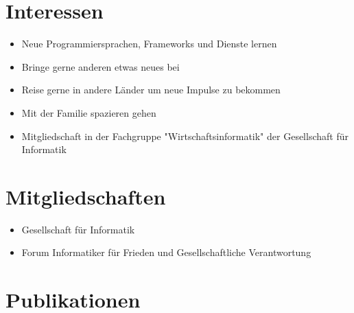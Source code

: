 \documentclass[a4paper]{friggeri-cv} %
\begin{document}
\section{Interessen}
\begin{itemize}
  \item Neue Programmiersprachen, Frameworks und Dienste lernen
  \item Bringe gerne anderen etwas neues bei
  \item Reise gerne in andere Länder um neue Impulse zu bekommen
  \item Mit der Familie spazieren gehen
  \item Mitgliedschaft in der Fachgruppe "Wirtschaftsinformatik" der Gesellschaft für Informatik
\end{itemize}

\section{Mitgliedschaften}
\begin{itemize}
	\item Gesellschaft für Informatik
	\item Forum Informatiker für Frieden und Gesellschaftliche Verantwortung
\end{itemize}

\newpage
\section{Publikationen}





\end{document}
